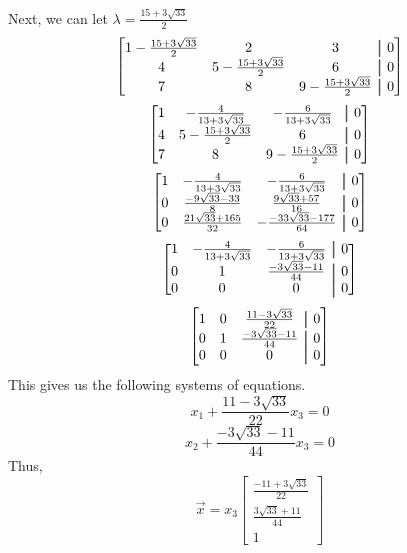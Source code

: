 \documentclass[12pt, letterpaper, twoside]{article}
\newcommand\aug{\fboxsep=-\fboxrule\!\!\!\fbox{\strut}\!\!\!} %
\begin{document}
\begin{enumerate}
Next, we can let \(\lambda=\frac{15+3\sqrt{33}}{2}\)
\[
\begin{bmatrix}
    1-\frac{15+3\sqrt{33}}{2}&2&3&\aug&0\\
    4&5-\frac{15+3\sqrt{33}}{2}&6&\aug&0\\
    7&8&9-\frac{15+3\sqrt{33}}{2}&\aug&0
\end{bmatrix}
\]
\[
\begin{bmatrix}
    1&-\frac{4}{13+3\sqrt{33}}&-\frac{6}{13+3\sqrt{33}}&\aug&0\\
    4&5-\frac{15+3\sqrt{33}}{2}&6&\aug&0\\
    7&8&9-\frac{15+3\sqrt{33}}{2}&\aug&0
\end{bmatrix}
\]
\[
\begin{bmatrix}
    1&-\frac{4}{13+3\sqrt{33}}&-\frac{6}{13+3\sqrt{33}}&\aug&0\\
    0&\frac{-9\sqrt{33}-33}{8}&\frac{9\sqrt{33}+57}{16}&\aug&0\\
    0&\frac{21\sqrt{33}+165}{32}&-\frac{-33\sqrt{33}-177}{64}&\aug&0
\end{bmatrix}
\]
\[
\begin{bmatrix}
    1&-\frac{4}{13+3\sqrt{33}}&-\frac{6}{13+3\sqrt{33}}&\aug&0\\
    0&1&\frac{-3\sqrt{33}-11}{44}&\aug&0\\
    0&0&0&\aug&0
\end{bmatrix}
\]
\[
\begin{bmatrix}
    1&0&\frac{11-3\sqrt{33}}{22}&\aug&0\\
    0&1&\frac{-3\sqrt{33}-11}{44}&\aug&0\\
    0&0&0&\aug&0
\end{bmatrix}
\]
This gives us the following systems of equations.
\[x_1+\frac{11-3\sqrt{33}}{22}x_3=0\]
\[x_2+\frac{-3\sqrt{33}-11}{44}x_3=0\]
Thus, 
\[\vec{x}=x_3\begin{bmatrix}
    \frac{-11+3\sqrt{33}}{22}\\
    \frac{3\sqrt{33}+11}{44}\\
    1
\end{bmatrix}\]


\end{enumerate}
\end{document}
